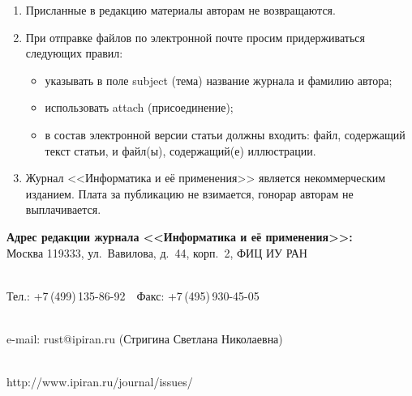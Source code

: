 {\begin{enumerate}[1.]
\item Присланные в редакцию материалы авторам не возвращаются.\\[-13.5pt]

\item При отправке файлов по электронной почте просим придерживаться следующих
правил:
\begin{itemize}
\item указывать в поле subject (тема) название журнала и фамилию автора;\\[-13.5pt]
\item использовать attach (присоединение);\\[-13.5pt]
\item в состав электронной версии статьи должны входить: файл, содержащий текст
статьи, и файл(ы), содержащий(е) иллюстрации.\\[-13.5pt]
\end{itemize}

\item Журнал <<Информатика и её применения>> является некоммерческим изданием.
Плата за публикацию не взимается, гонорар авторам не выплачивается.
\end{enumerate}



\def\leftfootline{\small{\textbf{\thepage}
\hfill ИНФОРМАТИКА И ЕЁ ПРИМЕНЕНИЯ\ \ \ том\ 14\ \ \ выпуск\ 3\ \ \ 2020}
}%
 \def\rightfootline{\small{ИНФОРМАТИКА И ЕЁ ПРИМЕНЕНИЯ\ \ \ том\ 14\ \ \ выпуск\ 3\ \ \ 2020
\hfill \textbf{\thepage}}}



\begin{center}

\textbf{Адрес редакции журнала <<Информатика и её применения>>:} \\




Москва 119333, ул.~Вавилова, д.~44, корп.~2, ФИЦ ИУ РАН\\[-10pt]

\

Тел.: +7\,(499)\,135-86-92\ \ Факс:  +7\,(495)\,930-45-05\\[-10pt]

 \

e-mail:   {\sf rust@ipiran.ru} (Стригина Светлана Николаевна)\\[-10pt]

\

{\sf http://www.ipiran.ru/journal/issues/}
\end{center}
}


\def\leftkol{Правила подготовки рукописей  для публикации в журнале
<<Информатика и её применения>>}

\def\rightkol{Правила подготовки рукописей  для публикации в журнале
<<Информатика и её применения>>}


\def\leftfootline{\small{\textbf{\thepage}
\hfill ИНФОРМАТИКА И ЕЁ ПРИМЕНЕНИЯ\ \ \ том\ 14\ \ \ выпуск\ 3\ \ \ 2020}
}%
 \def\rightfootline{\small{ИНФОРМАТИКА И ЕЁ ПРИМЕНЕНИЯ\ \ \ том\ 14\ \ \ выпуск\ 3\ \ \ 2020
\hfill \textbf{\thepage}}} 